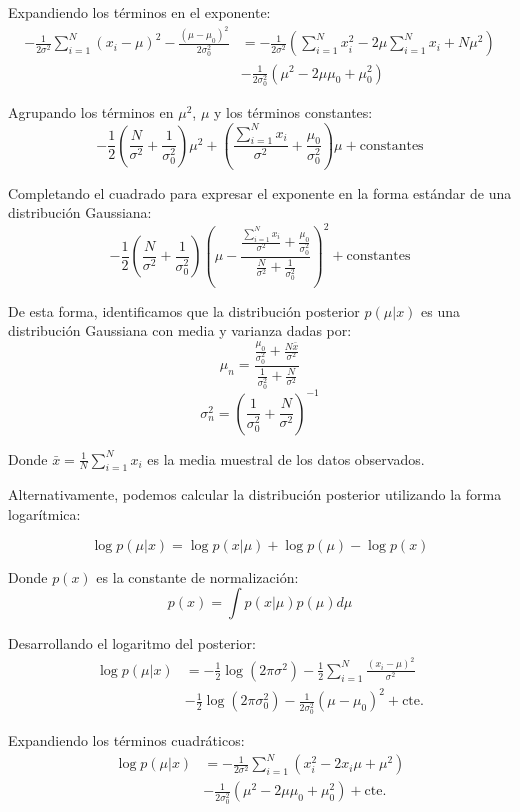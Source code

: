Expandiendo los términos en el exponente:
\begin{align*}
-\frac{1}{2\sigma^2}\sum_{i=1}^{N}(x_i - \mu)^2 - \frac{(\mu - \mu_0)^2}{2\sigma_0^2} &= -\frac{1}{2\sigma^2}\left(\sum_{i=1}^{N}x_i^2 - 2\mu\sum_{i=1}^{N}x_i + N\mu^2\right) \\
&- \frac{1}{2\sigma_0^2}(\mu^2 - 2\mu\mu_0 + \mu_0^2)
\end{align*}

Agrupando los términos en \(\mu^2\), \(\mu\) y los términos constantes:
\[-\frac{1}{2}\left(\frac{N}{\sigma^2} + \frac{1}{\sigma_0^2}\right)\mu^2 + \left(\frac{\sum_{i=1}^{N}x_i}{\sigma^2} + \frac{\mu_0}{\sigma_0^2}\right)\mu + \text{constantes}\]

Completando el cuadrado para expresar el exponente en la forma estándar de una distribución Gaussiana:
\[-\frac{1}{2}\left(\frac{N}{\sigma^2} + \frac{1}{\sigma_0^2}\right)\left(\mu - \frac{\frac{\sum_{i=1}^{N}x_i}{\sigma^2} + \frac{\mu_0}{\sigma_0^2}}{\frac{N}{\sigma^2} + \frac{1}{\sigma_0^2}}\right)^2 + \text{constantes}\]

De esta forma, identificamos que la distribución posterior \(p(\mu|x)\) es una distribución Gaussiana con media y varianza dadas por:
\[\mu_n = \frac{\frac{\mu_0}{\sigma_0^2} + \frac{N\bar{x}}{\sigma^2}}{\frac{1}{\sigma_0^2} + \frac{N}{\sigma^2}}\]
\[\sigma_n^2 = \left(\frac{1}{\sigma_0^2} + \frac{N}{\sigma^2}\right)^{-1}\]

Donde \(\bar{x} = \frac{1}{N}\sum_{i=1}^{N}x_i\) es la media muestral de los datos observados.

Alternativamente, podemos calcular la distribución posterior utilizando la forma logarítmica:

\[\log p(\mu|x)=\log p(x|\mu) + \log p(\mu) - \log p(x)\]

Donde \(p(x)\) es la constante de normalización:
\[p(x)=\int p(x|\mu)p(\mu) d\mu\]

Desarrollando el logaritmo del posterior:
\begin{align*}
\log p(\mu|x) &= -\frac{1}{2}\log(2\pi\sigma^2) - \frac{1}{2}\sum_{i=1}^{N}\frac{(x_i-\mu)^2}{\sigma^2} \\
&-\frac{1}{2}\log(2\pi\sigma_{0}^2) - \frac{1}{2\sigma_{0}^2}(\mu-\mu_{0})^2 + \text{cte.}
\end{align*}

Expandiendo los términos cuadráticos:
\begin{align*}
\log p(\mu|x) &= -\frac{1}{2\sigma^2}\sum_{i=1}^{N}(x_{i}^2-2x_{i}\mu+\mu^2) \\
&-\frac{1}{2\sigma_{0}^2}(\mu^2-2\mu\mu_0+\mu_{0}^2) + \text{cte.}
\end{align*}

